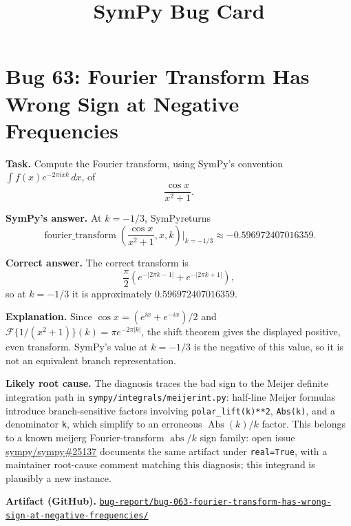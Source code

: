 \documentclass[11pt]{article}
\title{SymPy Bug Card}
\author{}
\date{}
\newcommand{\SymPy}{SymPy}
\newcommand{\artifactrepo}{https://github.com/TODO-org/TODO-repo}
\newcommand{\bugbundle}[1]{\href{\artifactrepo/tree/main/bug-report/#1}{\nolinkurl{bug-report/#1/}}}
\begin{document}
\maketitle

\section*{Bug 63: Fourier Transform Has Wrong Sign at Negative Frequencies}

\begin{counterexamplebox}
\textbf{Task.} Compute the Fourier transform, using \SymPy's convention
\(\int f(x)e^{-2\pi i x k}\,dx\), of
\[
\frac{\cos x}{x^2+1}.
\]

\medskip
\textbf{SymPy's answer.} At \(k=-1/3\), \SymPy returns
\[
\operatorname{fourier\_transform}\!\left(\frac{\cos x}{x^2+1},x,k\right)
\Big|_{k=-1/3}
\approx -0.596972407016359.
\]

\medskip
\textbf{Correct answer.} The correct transform is
\[
\frac{\pi}{2}\left(e^{-|2\pi k-1|}+e^{-|2\pi k+1|}\right),
\]
so at \(k=-1/3\) it is approximately \(0.596972407016359\).

\medskip
\textbf{Explanation.} Since
\(\cos x=(e^{ix}+e^{-ix})/2\) and
\(\mathcal{F}\{1/(x^2+1)\}(k)=\pi e^{-2\pi |k|}\), the shift theorem gives
the displayed positive, even transform. \SymPy's value at \(k=-1/3\) is the
negative of this value, so it is not an equivalent branch representation.

\medskip
\textbf{Likely root cause.} The diagnosis traces the bad sign to the Meijer
definite integration path in \texttt{sympy/integrals/meijerint.py}: half-line
Meijer formulas introduce branch-sensitive factors involving
\texttt{polar\_lift(k)**2}, \texttt{Abs(k)}, and a denominator \texttt{k},
which simplify to an erroneous \(\operatorname{Abs}(k)/k\) factor. This belongs
to a known meijerg Fourier-transform \(\operatorname{abs}/k\) sign family: open
issue \href{https://github.com/sympy/sympy/issues/25137}{sympy/sympy\#25137}
documents the same artifact under \texttt{real=True}, with a maintainer
root-cause comment matching this diagnosis; this integrand is plausibly a new
instance.

\medskip
\textbf{Artifact (GitHub).} \bugbundle{bug-063-fourier-transform-has-wrong-sign-at-negative-frequencies}
\end{counterexamplebox}
\end{document}

